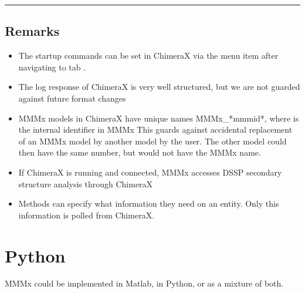 \documentclass[letterpaper,10pt,english]{sphinxmanual}
\begin{document}
\bigskip\hrule\bigskip



\section{Remarks}
\label{\detokenize{ChimeraX:remarks}}\begin{itemize}
\item {} 
The startup commands can be set in ChimeraX via the menu item  after navigating to tab .

\item {} 
The log response of ChimeraX is very well structured, but we are not guarded against future format changes

\item {} 
MMMx models in ChimeraX have unique names MMMx\_*mmmid*, where  is the internal identifier in MMMx
This guards against accidental replacement of an MMMx model by another model by the user.
The other model could then have the same number, but would not have the MMMx name.

\item {} 
If ChimeraX is running and connected, MMMx accesses DSSP secondary structure analysis through ChimeraX

\item {} 
Methods can specify what information they need on an entity. Only this information is polled from ChimeraX.

\end{itemize}


\chapter{Python}
\label{\detokenize{python:python}}\label{\detokenize{python::doc}}
MMMx could be implemented in Matlab, in Python, or as a mixture of both.
\end{document}
